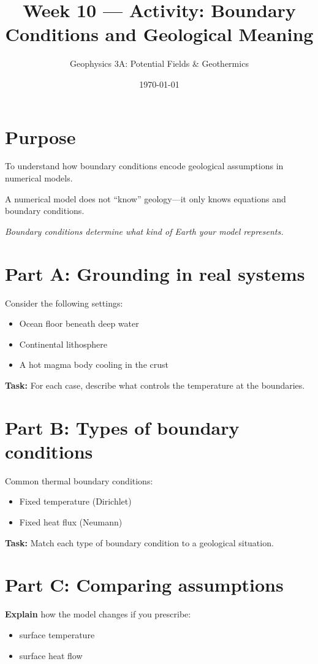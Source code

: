 \documentclass[11pt,a4paper]{article}
\title{Week 10 --- Activity: Boundary Conditions and Geological Meaning}
\author{Geophysics 3A: Potential Fields \& Geothermics}
\date{\today}
\begin{document}
\maketitle

\section*{Purpose}
To understand how boundary conditions encode geological assumptions in numerical
models.

A numerical model does not ``know'' geology—it only knows equations and boundary
conditions.

\emph{Boundary conditions determine what kind of Earth your model represents.}

\section*{Part A: Grounding in real systems}

Consider the following settings:
\begin{itemize}
    \item Ocean floor beneath deep water
    \item Continental lithosphere
    \item A hot magma body cooling in the crust
\end{itemize}

\textbf{Task:}
For each case, describe what controls the temperature at the boundaries.

\section*{Part B: Types of boundary conditions}

Common thermal boundary conditions:
\begin{itemize}
    \item Fixed temperature (Dirichlet)
    \item Fixed heat flux (Neumann)
\end{itemize}

\textbf{Task:}
Match each type of boundary condition to a geological situation.

\section*{Part C: Comparing assumptions}

\textbf{Explain} how the model changes if you prescribe:
\begin{itemize}
    \item surface temperature
    \item surface heat flow
\end{itemize}
\end{document}
